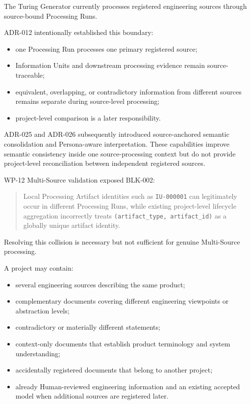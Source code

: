 The Turing Generator currently processes registered engineering sources through source-bound Processing Runs.

ADR-012 intentionally established this boundary:

\begin{itemize}
\tightlist
\item
  one Processing Run processes one primary registered source;
\item
  Information Units and downstream processing evidence remain source-traceable;
\item
  equivalent, overlapping, or contradictory information from different sources remains separate during source-level processing;
\item
  project-level comparison is a later responsibility.
\end{itemize}

ADR-025 and ADR-026 subsequently introduced source-anchored semantic consolidation and Persona-aware interpretation. These capabilities improve semantic consistency inside one source-processing context but do not provide project-level reconciliation between independent registered sources.

WP-12 Multi-Source validation exposed BLK-002:

\begin{quote}
Local Processing Artifact identities such as \texttt{IU-000001} can legitimately occur in different Processing Runs, while existing project-level lifecycle aggregation incorrectly treats \texttt{(artifact\_type,\ artifact\_id)} as a globally unique artifact identity.
\end{quote}

Resolving this collision is necessary but not sufficient for genuine Multi-Source processing.

A project may contain:

\begin{itemize}
\tightlist
\item
  several engineering sources describing the same product;
\item
  complementary documents covering different engineering viewpoints or abstraction levels;
\item
  contradictory or materially different statements;
\item
  context-only documents that establish product terminology and system understanding;
\item
  accidentally registered documents that belong to another project;
\item
  already Human-reviewed engineering information and an existing accepted model when additional sources are registered later.
\end{itemize}


